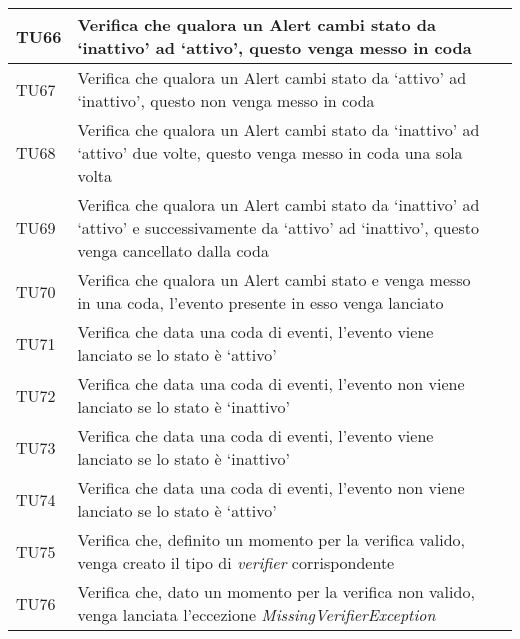 \begin{longtable}{  | >{\centering\arraybackslash}m{2.5cm} 
						| >{\raggedright\arraybackslash}m{9cm} 
						| >{\centering\arraybackslash}m{3.5cm} | }
				TU66 & Verifica che qualora un Alert cambi stato da `inattivo' ad `attivo', questo venga messo in coda
						& \donetext{} \\ \hline
				TU67 & Verifica che qualora un Alert cambi stato da `attivo' ad `inattivo', questo non venga messo in coda
						& \donetext{} \\ \hline
				TU68 & Verifica che qualora un Alert cambi stato da `inattivo' ad `attivo' due volte, questo venga messo in coda una sola volta
						& \donetext{} \\ \hline
				TU69 & Verifica che qualora un Alert cambi stato da `inattivo' ad `attivo' e successivamente da `attivo' ad `inattivo', questo venga cancellato dalla coda			& \donetext{} \\ \hline
				TU70 & Verifica che qualora un Alert cambi stato e venga messo in una coda, l'evento presente in esso venga lanciato
						& \donetext{} \\ \hline


				TU71 & Verifica che data una coda di eventi, l'evento viene lanciato se lo stato è `attivo'
						& \donetext{} \\ \hline
				TU72 & Verifica che data una coda di eventi, l'evento non viene lanciato se lo stato è `inattivo'
						& \donetext{} \\ \hline


				TU73 & Verifica che data una coda di eventi, l'evento viene lanciato se lo stato è `inattivo'
						& \donetext{} \\ \hline
				TU74 & Verifica che data una coda di eventi, l'evento non viene lanciato se lo stato è `attivo'
						& \donetext{} \\ \hline



				TU75 & Verifica che, definito un momento per la verifica valido, venga creato il tipo di \textit{verifier} corrispondente
						& \donetext{} \\ \hline
				TU76 & Verifica che, dato un momento per la verifica non valido, venga lanciata l'eccezione \textit{MissingVerifierException}
						& \donetext{} \\ \hline




\end{longtable}
